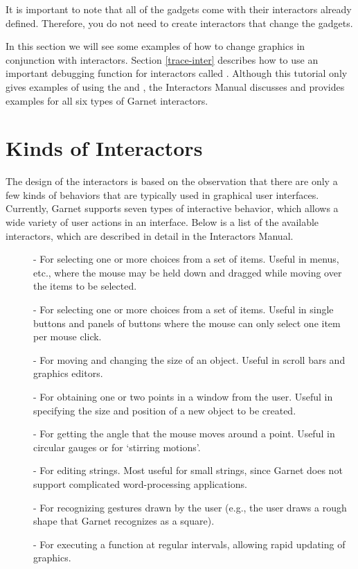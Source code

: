 It is important to note that all of the gadgets come with their
interactors already defined.  Therefore, you do not need to create
interactors that change the gadgets.

In this section we will see some examples of how to change graphics in
conjunction with interactors.  Section \ref{trace-inter} describes how
to use an important debugging function for interactors called
.   Although this tutorial only gives examples of
using the  and , the
Interactors Manual discusses and provides examples for all six types
of Garnet interactors.


\section{Kinds of Interactors}

The design of the interactors is based on the observation that there
are only a few kinds of behaviors that are typically used in graphical
user interfaces.  Currently, Garnet supports seven types of interactive
behavior, which allows a wide variety of user actions in an interface.
Below is a list of the available interactors, which are described in
detail in the Interactors Manual.

\begin{description}
\item[]  - For selecting one or more choices from a set of
items.  Useful in menus, etc., where the mouse may be held down and
dragged while moving over the items to be selected.

\item[]  - For selecting one or more choices from a set
of items.  Useful in single buttons and panels of buttons where the
mouse can only select one item per mouse click.

\item[]  - For moving and changing the size of an
object.  Useful in scroll bars and graphics editors.

\item[]  - For obtaining one or two points in a
window from the user.  Useful in specifying the size and position of a
new object to be created.

\item[]  - For getting the angle that the mouse moves
around a point.  Useful in circular gauges or for `stirring motions'.

\item[]  - For editing strings.  Most useful for small
strings, since Garnet does not support complicated word-processing
applications.

\item[]  - For recognizing gestures drawn by the user
(e.g., the user draws a rough shape that Garnet recognizes as a square).

\item[]  - For executing a function at regular intervals,
allowing rapid updating of graphics.
\end{description}

